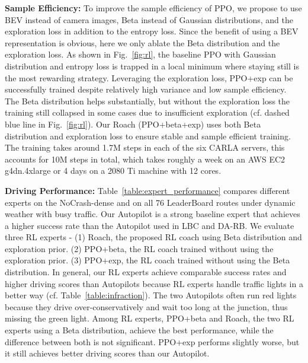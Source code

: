 \textbf{\textsf{Sample Efficiency:}}
To improve the sample efficiency of PPO, we propose to use BEV instead of camera images, Beta instead of Gaussian distributions, and the exploration loss in addition to the entropy loss.
Since the benefit of using a BEV representation is obvious, here we only ablate the Beta distribution and the exploration loss.
As shown in Fig.~\ref{fig:rl}, the baseline PPO with Gaussian distribution and entropy loss is trapped in a local minimum where staying still is the most rewarding strategy.
Leveraging the exploration loss, PPO+exp can be successfully trained despite relatively high variance and low sample efficiency.
The Beta distribution helps substantially, but without the exploration loss the training still collapsed in some cases due to insufficient exploration (cf. dashed blue line in Fig.~\ref{fig:rl}).
Our Roach (PPO+beta+exp) uses both Beta distribution and exploration loss to ensure stable and sample efficient training.
The training takes around 1.7M steps in each of the six CARLA servers, this accounts for 10M steps in total, which takes roughly a week on an AWS EC2 g4dn.4xlarge or 4 days on a 2080 Ti machine with 12 cores.


\textbf{\textsf{Driving Performance:}}
Table~\ref{table:expert_performance} compares different experts on the NoCrash-dense and on all 76 LeaderBoard routes under dynamic weather with busy traffic.
Our Autopilot is a strong baseline expert that achieves a higher success rate than the Autopilot used in LBC and DA-RB.
We evaluate three RL experts - 
(1) Roach, the proposed RL coach using Beta distribution and exploration prior.
(2) PPO+beta, the RL coach trained without using the exploration prior. 
(3) PPO+exp, the RL coach trained without using the Beta distribution.
In general, our RL experts achieve comparable success rates and higher driving scores than Autopilots because RL experts handle traffic lights in a better way (cf. Table~\ref{table:infraction}).
The two Autopilots often run red lights because they drive over-conservatively and wait too long at the junction, thus missing the green light.
Among RL experts, PPO+beta and Roach, the two RL experts using a Beta distribution, achieve the best performance, while the difference between both is not significant. PPO+exp performs slightly worse, but it still achieves better driving scores than our Autopilot. 


